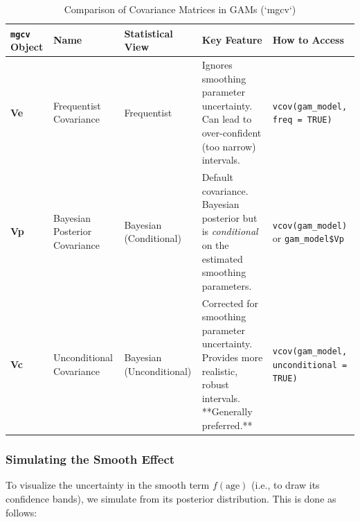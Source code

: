 \documentclass[11pt, a4paper]{article}
\begin{document}
\begin{table}[h!]
\centering
\caption{Comparison of Covariance Matrices in GAMs (`mgcv`)}
\label{tab:covariance_matrices}
\begin{tabularx}{\linewidth}{>{\RaggedRight}p{1.5cm} >{\RaggedRight}p{2.2cm} >{\RaggedRight}p{2.5cm} >{\RaggedRight}X >{\RaggedRight\arraybackslash}X}
\toprule
\textbf{\texttt{mgcv} Object} & \textbf{Name} & \textbf{Statistical View} & \textbf{Key Feature} & \textbf{How to Access} \\
\midrule
\textbf{Ve} & Frequentist Covariance & Frequentist & Ignores smoothing parameter uncertainty. Can lead to over-confident (too narrow) intervals. & \texttt{vcov(gam\_model, freq = TRUE)} \\
\addlinespace
\textbf{Vp} & Bayesian Posterior Covariance & Bayesian (Conditional) & Default covariance. Bayesian posterior but is \textit{conditional} on the estimated smoothing parameters. & \texttt{vcov(gam\_model)} or \texttt{gam\_model\$Vp} \\
\addlinespace
\textbf{Vc} & Unconditional Covariance & Bayesian (Unconditional) & Corrected for smoothing parameter uncertainty. Provides more realistic, robust intervals. **Generally preferred.** & \texttt{vcov(gam\_model, unconditional = TRUE)} \\
\bottomrule
\end{tabularx}
\end{table}


\subsubsection{Simulating the Smooth Effect}
To visualize the uncertainty in the smooth term $f(\text{age})$ (i.e., to draw its confidence bands), we simulate from its posterior distribution. This is done as follows:
\end{document}
